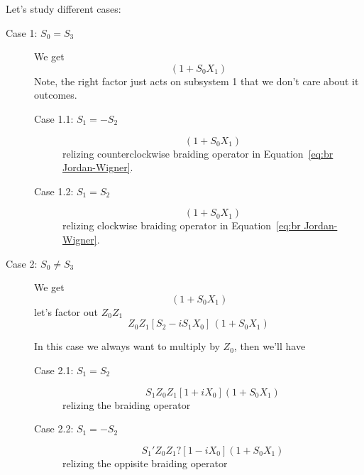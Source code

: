 \documentclass{article}
\begin{document}
Let's study different cases:
\begin{description}
	\item[Case 1: $ S_0 = S_3 $]
		We get \begin{equation*}
			[1 -i X_0 S_2 S_1] (1 + S_0 X_1)
		\end{equation*}
		Note, the right factor just acts on subsystem 1 that we don't care about
		it outcomes.

		\begin{description}
			\item[Case 1.1: $ S_1 = -S_2 $]
				\begin{equation*}
					[1 + i X_0] (1 + S_0 X_1)
				\end{equation*}
				relizing counterclockwise braiding operator in Equation~\ref{eq:br Jordan-Wigner}.
			\item[Case 1.2: $ S_1 = S_2 $]
				\begin{equation*}
					[1 - i X_0] (1 + S_0 X_1)
				\end{equation*}
				relizing clockwise braiding operator in Equation~\ref{eq:br Jordan-Wigner}.
		\end{description}

	\item[Case 2: $ S_0 \ne S_3 $]
		We get \begin{equation*}
			[S_2 Z_0 Z_1 + S_1 Y_0 Z_1]\, (1 + S_0 X_1)
		\end{equation*}
		let's factor out $ Z_0 Z_1 $
		\begin{equation*}
			Z_0 Z_1 [S_2 - i S_1 X_0]\, (1 + S_0 X_1)
		\end{equation*}

		In this case we always want to multiply by $ Z_0 $, then we'll have
		\begin{description}
			\item[Case 2.1: $ S_1 = S_2 $]
				\begin{equation*}
					S_1 Z_0 Z_1 [1 + i X_0] (1 + S_0 X_1)
				\end{equation*}
				relizing the braiding operator
			\item[Case 2.2: $ S_1 = - S_2 $]
				\begin{equation*}
					S_1' Z_0 Z_1 ? [1 - i X_0] (1 + S_0 X_1)
				\end{equation*}
				relizing the oppisite braiding operator
		\end{description}
\end{description}
\end{document}
